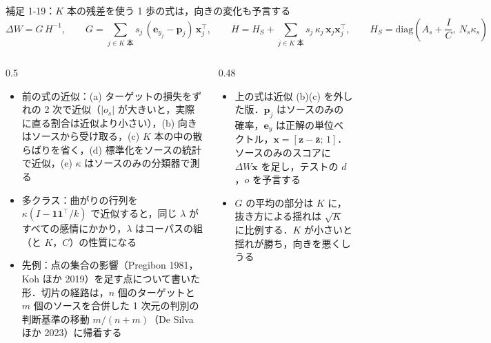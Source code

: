 \begin{frame}{補足 1-19：$K$ 本の残差を使う 1 歩の式は，向きの変化も予言する}
  \vspace{-0.3em}
  {\tighteq\small
  \[ \Delta W = G\,H^{-1},\qquad G = \sum_{j \in K\text{ 本}} s_j\,(\mathbf e_{y_j} - \mathbf p_j)\,\mathbf x_j^{\top},\qquad H = H_S + \sum_{j \in K\text{ 本}} s_j\,\kappa_j\,\mathbf x_j\mathbf x_j^{\top},\qquad H_S = \mathrm{diag}\!\left(A_s + \frac IC,\ N_s\kappa_s\right) \]}
  \vspace{-0.3em}
  \begin{columns}[T,onlytextwidth]
    \begin{column}{0.5\textwidth}
      \begin{itemize}\scriptsize\setlength{\itemsep}{3pt}
        \item 前の式の近似：(a) ターゲットの損失をずれの 2 次で近似（$|o_s|$ が大きいと，実際に直る割合は近似より小さい），(b) 向きはソースから受け取る，(c) $K$ 本の中の散らばりを省く，(d) 標準化をソースの統計で近似，(e) $\kappa$ はソースのみの分類器で測る
        \item 多クラス：曲がりの行列を $\kappa(I - \mathbf 1\mathbf 1^{\top}/k)$ で近似すると，同じ $\lambda$ がすべての感情にかかり，$\lambda$ はコーパスの組（と $K$，$C$）の性質になる
        \item 先例：点の集合の影響（Pregibon 1981，Koh ほか 2019）を足す点について書いた形．切片の経路は，$n$ 個のターゲットと $m$ 個のソースを合併した 1 次元の判別の判断基準の移動 $m/(n+m)$（De Silva ほか 2023）に帰着する
      \end{itemize}
    \end{column}
    \begin{column}{0.48\textwidth}
      \begin{itemize}\scriptsize\setlength{\itemsep}{3pt}
        \item 上の式は近似 (b)(c) を外した版．$\mathbf p_j$ はソースのみの確率，$\mathbf e_{y}$ は正解の単位ベクトル，$\mathbf x = [\mathbf z - \bar{\mathbf z};\,1]$．ソースのみのスコアに $\Delta W\mathbf x$ を足し，テストの $d$，$o$ を予言する
        \item $G$ の平均の部分は $K$ に，抜き方による揺れは $\sqrt K$ に比例する．$K$ が小さいと揺れが勝ち，向きを悪くしうる
      \end{itemize}
      \vspace{0.1em}
      \centering\scriptsize
      \setlength{\tabcolsep}{4pt}

\end{column}
\end{columns}
\end{frame}
